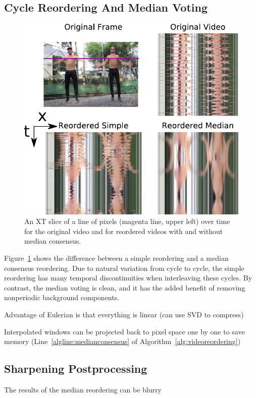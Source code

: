 \documentclass{article}
\begin{document}
\subsection{Cycle Reordering And Median Voting}
\label{sec:cyclereordering}

\begin{figure}[h!]
\centering
\includegraphics[width=0.8\columnwidth]{XTSlice.pdf}
\caption{An XT slice of a line of pixels (magenta line, upper left) over time for the original video and for reordered videos with and without median consensus.}
\label{fig:XTSlice}
\end{figure}

Figure~\ref{fig:XTSlice} shows the difference between a simple reordering and a median consensus reordering.  Due to natural variation from cycle to cycle, the simple reordering has many temporal discontinuities when interleaving these cycles.  By contrast, the median voting is clean, and it has the added benefit of removing nonperiodic background components.

Advantage of Eulerian is that everything is linear (can use SVD to compress)

Interpolated windows can be projected back to pixel space one by one to save memory (Line~\ref{algline:medianconsensus} of Algorithm~\ref{alg:videoreordering})

\subsection{Sharpening Postprocessing}

The results of the median reordering can be blurry
\end{document}
